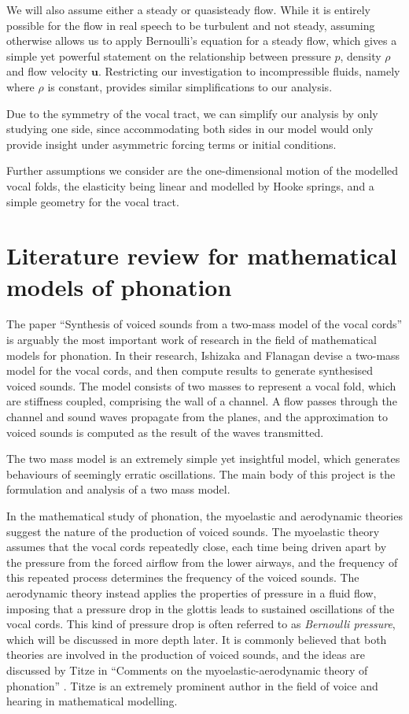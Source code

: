 \documentclass{report}
\begin{document}
We will also assume either a steady or quasisteady flow.
While it is entirely possible for the flow in real speech to be turbulent and not steady,
assuming otherwise allows us to apply Bernoulli's equation for a steady flow,
which gives a simple yet powerful statement on the relationship between pressure $p$, density $\rho$ and flow velocity $\mathbf{u}$.
Restricting our investigation to incompressible fluids, namely where $\rho$ is constant,
provides similar simplifications to our analysis.

Due to the symmetry of the vocal tract,
we can simplify our analysis by only studying one side,
since accommodating both sides in our model would only provide insight under asymmetric forcing terms or initial conditions.

Further assumptions we consider are the one-dimensional motion of the modelled vocal folds,
the elasticity being linear and modelled by Hooke springs,
and a simple geometry for the vocal tract. 

\section{Literature review for mathematical models of phonation}

The paper ``Synthesis of voiced sounds from a two-mass model of the vocal cords'' \cite[1972]{ishizaka_flanagan_1972} is arguably the most important work of research in the field of mathematical models for phonation.
In their research, Ishizaka and Flanagan devise a two-mass model for the vocal cords, and then compute results to generate synthesised voiced sounds.
The model consists of two masses to represent a vocal fold, which are stiffness coupled, comprising the wall of a channel.
A flow passes through the channel and sound waves propagate from the planes,
and the approximation to voiced sounds is computed as the result of the waves transmitted. %

The two mass model is an extremely simple yet insightful model,
which generates behaviours of seemingly erratic oscillations.
The main body of this project is the formulation and analysis of a two mass model.

In the mathematical study of phonation, the myoelastic and aerodynamic theories suggest the nature of the production of voiced sounds.
The myoelastic theory assumes that the vocal cords repeatedly close,
each time being driven apart by the pressure from the forced airflow from the lower airways,
and the frequency of this repeated process determines the frequency of the voiced sounds.
The aerodynamic theory instead applies the properties of pressure in a fluid flow,
imposing that a pressure drop in the glottis leads to sustained oscillations of the vocal cords.
This kind of pressure drop is often referred to as \textit{Bernoulli pressure}, which will be discussed in more depth later.
It is commonly believed that both theories are involved in the production of voiced sounds,
and the ideas are discussed by Titze in ``Comments on the myoelastic-aerodynamic theory of phonation'' \cite[1980]{titze_1980}.
Titze is an extremely prominent author in the field of voice and hearing in mathematical modelling.
\end{document}

